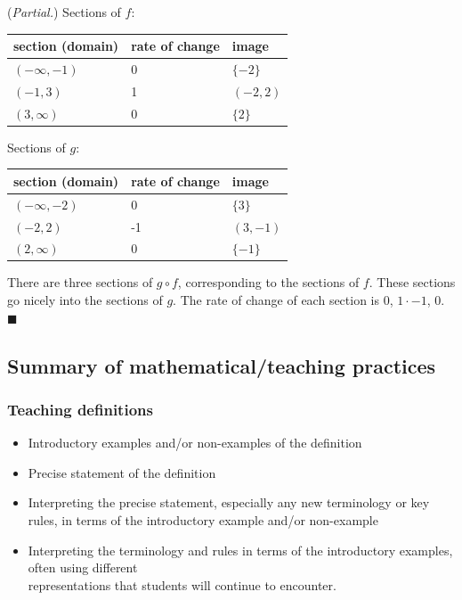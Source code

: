 \documentclass[11pt]{article}
\theoremstyle{definition}
\newenvironment{solution}{{\it Solution.} }{\hfill {\color{lightgray}$\blacksquare$}}
\begin{document}
\begin{solution} ({\it Partial.})
Sections of $f$:  \\
\begin{tabular}{L{1.75in}L{1.75in}L{1.75in}}
section (domain) & rate of change & image \\ \hline
$(-\infty, -1)$ & 0 & $\{-2\}$ \\
$(-1,3)$ & 1 & $(-2,2)$ \\
$(3,\infty)$ & 0 & $\{2\}$
\end{tabular}

Sections of $g$:  \\
\begin{tabular}{L{1.75in}L{1.75in}L{1.75in}}
section (domain) & rate of change & image \\ \hline
$(-\infty, -2)$ & 0 & $\{3\}$ \\
$(-2,2)$ & -1 & $(3,-1)$ \\
$(2,\infty)$ & 0 & $\{-1\}$
\end{tabular}

There are three sections of $g\circ f$, corresponding to the sections of $f$. These sections go nicely into the sections of $g$. The rate of change of each section is $0$, $1\cdot-1$, $0$. 
\end{solution}

\newpage

\subsection{Summary of mathematical/teaching practices}

\subsubsection*{Teaching definitions}
	\begin{itemize}
	\item Introductory examples and/or non-examples of the definition
	\item Precise statement of the definition
	\item Interpreting the precise statement, especially any new terminology or key rules, in terms of the introductory example and/or non-example
	\item Interpreting the terminology and rules in terms of the introductory examples, often using different \\ representations that students will continue to encounter.
	\end{itemize}
	
\end{document}
